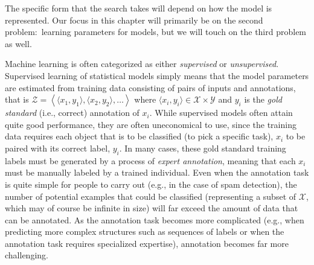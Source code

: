 \noindent The specific form that the search takes will depend on how
the model is represented.  Our focus in this chapter will primarily be
on the second problem:\ learning parameters for models, but we will
touch on the third problem as well.

Machine learning is often categorized as either \emph{supervised} or
\emph{unsupervised}.  Supervised learning of statistical models simply
means that the model parameters are estimated from training data
consisting of pairs of inputs and annotations, that is $\mathcal{Z} =
\left\langle \langle x_1,y_1 \rangle , \langle x_2,y_2 \rangle ,
\ldots \right\rangle$ where $\langle x_i, y_i \rangle \in \mathcal{X}
\times \mathcal{Y}$ and $y_i$ is the \emph{gold standard} (i.e.,
correct) annotation of $x_i$.  While supervised models often attain
quite good performance, they are often uneconomical to use, since the
training data requires each object that is to be classified (to pick a
specific task), $x_i$ to be paired with its correct label, $y_i$.  In
many cases, these gold standard training labels must be generated by a
process of \emph{expert annotation}, meaning that each $x_i$ must be
manually labeled by a trained individual.  Even when the annotation
task is quite simple for people to carry out (e.g., in the case of
spam detection), the number of potential examples that could be
classified (representing a subset of $\mathcal{X}$, which may of
course be infinite in size) will far exceed the amount of data that
can be annotated.  As the annotation task becomes more complicated
(e.g., when predicting more complex structures such as sequences of
labels or when the annotation task requires specialized expertise),
annotation becomes far more challenging.

